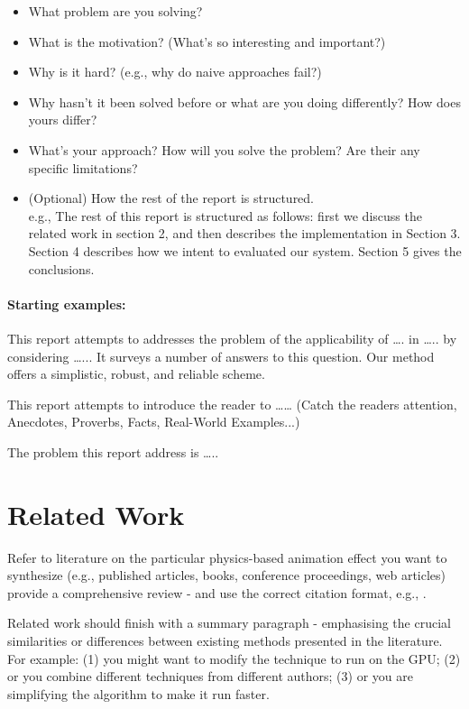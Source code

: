 \documentclass[conference,backref=page]{acmsiggraph}
\begin{document}
\begin{itemize}
\item What problem are you solving?
\item What is the motivation? (What's so interesting and important?)
\item Why is it hard? (e.g., why do naive approaches fail?)
\item Why hasn't it been solved before or what are you doing differently? How does yours differ?
\item What's your approach?  How will you solve the problem?  Are their any specific limitations?
\item (Optional) How the rest of the report is structured.\\
e.g., The rest of this report is structured as follows: first we discuss the related work in section 2, and then describes the implementation in Section 3.  Section 4 describes how we intent to evaluated our system.  Section 5 gives the conclusions.
\end{itemize}

\paragraph{Starting examples:}
This report attempts to addresses the problem of the applicability of …. in ….. by considering …...  It surveys a number of answers to this question.  Our method offers a simplistic, robust, and reliable scheme.

This report attempts to introduce the reader to …… 
(Catch the readers attention, Anecdotes, Proverbs, Facts, Real-World Examples...)

The problem this report address is …..


\section{Related Work}

Refer to literature on the particular physics-based animation effect you want to synthesize (e.g., published articles, books, conference proceedings, web articles) provide a comprehensive review - and use the correct citation format, e.g., \cite{Sako00}.

Related work should finish with a summary paragraph - emphasising the crucial similarities or differences between existing methods presented in the literature.  For example: (1) you might want to modify the technique to run on the GPU; (2) or you combine different techniques from different authors; (3) or you are simplifying the algorithm to make it run faster.
\end{document}
